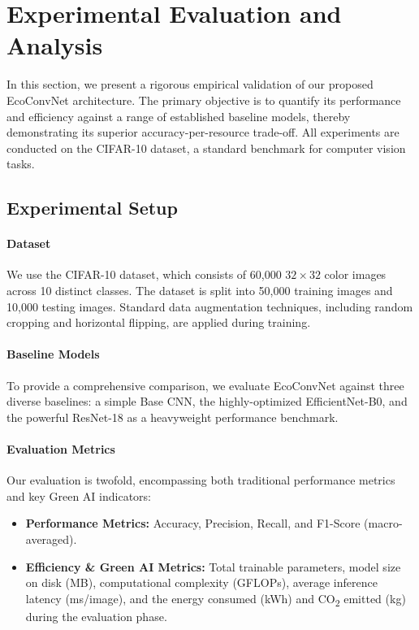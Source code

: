 \documentclass[12pt, a4paper]{article}
\begin{document}
\section{Experimental Evaluation and Analysis}
\label{sec:results}

In this section, we present a rigorous empirical validation of our proposed EcoConvNet architecture. The primary objective is to quantify its performance and efficiency against a range of established baseline models, thereby demonstrating its superior accuracy-per-resource trade-off. All experiments are conducted on the CIFAR-10 dataset, a standard benchmark for computer vision tasks.

\subsection{Experimental Setup}
\label{ssec:setup}

\paragraph{Dataset} We use the CIFAR-10 dataset, which consists of 60,000 $32 \times 32$ color images across 10 distinct classes. The dataset is split into 50,000 training images and 10,000 testing images. Standard data augmentation techniques, including random cropping and horizontal flipping, are applied during training.

\paragraph{Baseline Models} To provide a comprehensive comparison, we evaluate EcoConvNet against three diverse baselines: a simple Base CNN, the highly-optimized EfficientNet-B0, and the powerful ResNet-18 as a heavyweight performance benchmark.

\paragraph{Evaluation Metrics} Our evaluation is twofold, encompassing both traditional performance metrics and key Green AI indicators:
\begin{itemize}
    \item \textbf{Performance Metrics:} Accuracy, Precision, Recall, and F1-Score (macro-averaged).
    \item \textbf{Efficiency \& Green AI Metrics:} Total trainable parameters, model size on disk (MB), computational complexity (GFLOPs), average inference latency (ms/image), and the energy consumed (kWh) and CO\textsubscript{2} emitted (kg) during the evaluation phase.
\end{itemize}
\end{document}
